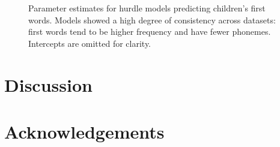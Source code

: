 \documentclass[10pt,letterpaper]{article}
\begin{document}
\begin{figure}[tb]
\caption{\label{fig:hurdles} Parameter estimates for hurdle models predicting children's first words. Models showed a high degree of consistency across datasets: first words tend to be higher frequency and have fewer phonemes. Intercepts are omitted for clarity.}
\end{figure}

\section{Discussion}

\section{Acknowledgements}




\setlength{\bibleftmargin}{.125in}
\setlength{\bibindent}{--\bibleftmargin}


\end{document}

